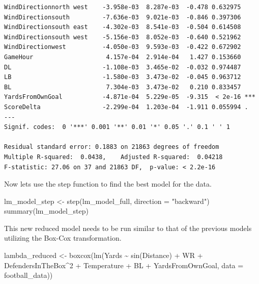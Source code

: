 \documentclass[
  super,
  preprint,
  3p]{elsarticle}
\newenvironment{Shaded}{\begin{snugshade}}{\end{snugshade}}
\newcommand{\AttributeTok}[1]{\textcolor[rgb]{0.40,0.45,0.13}{#1}}
\newcommand{\DecValTok}[1]{\textcolor[rgb]{0.68,0.00,0.00}{#1}}
\newcommand{\FunctionTok}[1]{\textcolor[rgb]{0.28,0.35,0.67}{#1}}
\newcommand{\NormalTok}[1]{\textcolor[rgb]{0.00,0.23,0.31}{#1}}
\newcommand{\OtherTok}[1]{\textcolor[rgb]{0.00,0.23,0.31}{#1}}
\newcommand{\SpecialCharTok}[1]{\textcolor[rgb]{0.37,0.37,0.37}{#1}}
\newcommand{\StringTok}[1]{\textcolor[rgb]{0.13,0.47,0.30}{#1}}
\begin{document}
\begin{verbatim}
WindDirectionnorth west    -3.958e-03  8.287e-03  -0.478 0.632975    
WindDirectionsouth         -7.636e-03  9.021e-03  -0.846 0.397306    
WindDirectionsouth east    -4.302e-03  8.541e-03  -0.504 0.614508    
WindDirectionsouth west    -5.156e-03  8.052e-03  -0.640 0.521962    
WindDirectionwest          -4.050e-03  9.593e-03  -0.422 0.672902    
GameHour                    4.157e-04  2.914e-04   1.427 0.153660    
DL                         -1.108e-03  3.465e-02  -0.032 0.974487    
LB                         -1.580e-03  3.473e-02  -0.045 0.963712    
BL                          7.304e-03  3.473e-02   0.210 0.833457    
YardsFromOwnGoal           -4.871e-04  5.229e-05  -9.315  < 2e-16 ***
ScoreDelta                 -2.299e-04  1.203e-04  -1.911 0.055994 .  
---
Signif. codes:  0 '***' 0.001 '**' 0.01 '*' 0.05 '.' 0.1 ' ' 1

Residual standard error: 0.1883 on 21863 degrees of freedom
Multiple R-squared:  0.0438,    Adjusted R-squared:  0.04218 
F-statistic: 27.06 on 37 and 21863 DF,  p-value: < 2.2e-16
\end{verbatim}

Now lets use the step function to find the best model for the data.

\begin{Shaded}
\begin{Highlighting}[]
\NormalTok{lm\_model\_step }\OtherTok{\textless{}{-}} \FunctionTok{step}\NormalTok{(lm\_model\_full, }\AttributeTok{direction =} \StringTok{"backward"}\NormalTok{)}
\FunctionTok{summary}\NormalTok{(lm\_model\_step)}
\end{Highlighting}
\end{Shaded}

This new reduced model needs to be run similar to that of the previous
models utilizing the Box-Cox transformation.

\begin{Shaded}
\begin{Highlighting}[]
\NormalTok{lambda\_reduced }\OtherTok{\textless{}{-}} \FunctionTok{boxcox}\NormalTok{(}\FunctionTok{lm}\NormalTok{(Yards }\SpecialCharTok{\textasciitilde{}} \FunctionTok{sin}\NormalTok{(Distance) }\SpecialCharTok{+}\NormalTok{ WR }\SpecialCharTok{+}\NormalTok{ DefendersInTheBox}\SpecialCharTok{\^{}}\DecValTok{2} \SpecialCharTok{+}\NormalTok{ Temperature }\SpecialCharTok{+}\NormalTok{ BL }\SpecialCharTok{+}\NormalTok{ YardsFromOwnGoal, }\AttributeTok{data =}\NormalTok{ football\_data))}
\end{Highlighting}
\end{Shaded}
\end{document}
